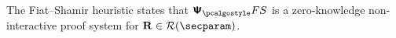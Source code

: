 \noindent
The Fiat--Shamir heuristic states that $\proofsystem_\fs$ is a zero-knowledge
non-interactive proof system for $\REL \in \RELGEN(\secparam)$.

%
